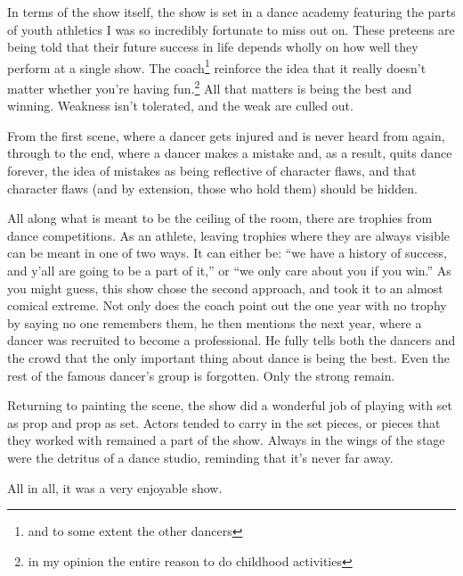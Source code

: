 \documentclass[12pt]{article}[titlepage]
\newcommand{\say}[1]{``#1''}
\newcommand{\1}{\={a}}
\newcommand{\2}{\={e}}
\newcommand{\3}{\={\i}}
\newcommand{\4}{\=o}
\newcommand{\5}{\=u}
\newcommand{\6}{\={A}}
\renewcommand{\,}{\textsuperscript{,}}
\begin{document}
In terms of the show itself, the show is set in a dance academy featuring the parts of youth athletics I was so incredibly fortunate to miss out on.
These preteens are being told that their future success in life depends wholly on how well they perform at a single show.
The coach\footnote{and to some extent the other dancers} reinforce the idea that it really doesn't matter whether you're having fun.\footnote{in my opinion the entire reason to do childhood activities}
All that matters is being the best and winning.
Weakness isn't tolerated, and the weak are culled out.

From the first scene, where a dancer gets injured and is never heard from again, through to the end, where a dancer makes a mistake and, as a result, quits dance forever, the idea of mistakes as being reflective of character flaws, and that character flaws (and by extension, those who hold them) should be hidden.

All along what is meant to be the ceiling of the room, there are trophies from dance competitions.
As an athlete, leaving trophies where they are always visible can be meant in one of two ways.
It can either be: \say{we have a history of success, and y'all are going to be a part of it,} or \say{we only care about you if you win.}
As you might guess, this show chose the second approach, and took it to an almost comical extreme.
Not only does the coach point out the one year with no trophy by saying no one remembers them, he then mentions the next year, where a dancer was recruited to become a professional.
He fully tells both the dancers and the crowd that the only important thing about dance is being the best.
Even the rest of the famous dancer's group is forgotten.
Only the strong remain.

Returning to painting the scene, the show did a wonderful job of playing with set as prop and prop as set.
Actors tended to carry in the set pieces, or pieces that they worked with remained a part of the show.
Always in the wings of the stage were the detritus of a dance studio, reminding that it's never far away.

All in all, it was a very enjoyable show.
\end{document}
